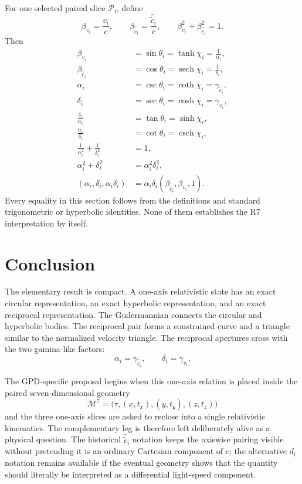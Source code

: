 \documentclass[11pt]{article}
\DeclareMathOperator{\sech}{sech}
\DeclareMathOperator{\csch}{csch}
\newcommand{\Mseven}{\mathcal{M}^{7}}
\newcommand{\ccomp}[1]{\widehat{\widetilde{c}}_{#1}}
\begin{document}
For one selected paired slice $\mathcal{P}_i$, define
\begin{equation}
\beta_{v_i}=\frac{v_i}{c},
\qquad
\beta_{\ccomp{i}}=\frac{\ccomp{i}}{c},
\qquad
\beta_{v_i}^2+\beta_{\ccomp{i}}^2=1.
\end{equation}
Then
\begin{align}
\beta_{v_i}
&=\sin\theta_i
=\tanh\chi_i
=\frac{1}{\alpha_i},
\label{eq:master1}\\
\beta_{\ccomp{i}}
&=\cos\theta_i
=\sech\chi_i
=\frac{1}{\delta_i},
\label{eq:master2}\\
\alpha_i
&=\csc\theta_i
=\coth\chi_i
=\gamma_{\ccomp{i}},
\label{eq:master3}\\
\delta_i
&=\sec\theta_i
=\cosh\chi_i
=\gamma_{v_i},
\label{eq:master4}\\
\frac{\delta_i}{\alpha_i}
&=\tan\theta_i
=\sinh\chi_i,
\label{eq:master5}\\
\frac{\alpha_i}{\delta_i}
&=\cot\theta_i
=\csch\chi_i,
\label{eq:master6}\\
\frac{1}{\alpha_i^2}
+
\frac{1}{\delta_i^2}
&=1,
\label{eq:master7}\\
\alpha_i^2+\delta_i^2
&=\alpha_i^2\delta_i^2,
\label{eq:master8}\\
(\alpha_i,\delta_i,\alpha_i\delta_i)
&=
\alpha_i\delta_i
\left(
\beta_{\ccomp{i}},\beta_{v_i},1
\right).
\label{eq:master9}
\end{align}
Every equality in this section follows from the definitions and standard
trigonometric or hyperbolic identities. None of them establishes the R7
interpretation by itself.

\section{Conclusion}

The elementary result is compact. A one-axis relativistic state has an exact
circular representation, an exact hyperbolic representation, and an exact
reciprocal representation. The Gudermannian connects the circular and
hyperbolic bodies. The reciprocal pair forms a constrained curve and a
triangle similar to the normalized velocity triangle. The reciprocal
apertures cross with the two gamma-like factors:
\begin{equation}
\alpha_i=\gamma_{\ccomp{i}},
\qquad
\delta_i=\gamma_{v_i}.
\end{equation}

The GPD-specific proposal begins when this one-axis relation is placed inside
the paired seven-dimensional geometry
\begin{equation}
\Mseven
=
\bigl(\tau,(x,t_x),(y,t_y),(z,t_z)\bigr)
\end{equation}
and the three one-axis slices are asked to reclose into a single relativistic
kinematics. The complementary leg is therefore left deliberately alive as a
physical question. The historical $\ccomp{i}$ notation keeps the axiswise
pairing visible without pretending it is an ordinary Cartesian component of
$c$; the alternative $d_i$ notation remains available if the eventual
geometry shows that the quantity should literally be interpreted as a
differential light-speed component.
\end{document}
